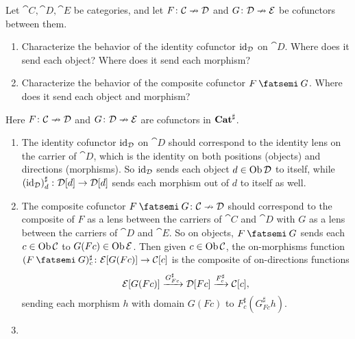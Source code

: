 \documentclass[Book-Poly]{subfiles}
\begin{document}
\begin{exercise}
Let $\cat{C},\cat{D},\cat{E}$ be categories, and let $F\colon\mathcal{C}\nrightarrow\mathcal{D}$ and $G\colon\mathcal{D}\nrightarrow\mathcal{E}$ be cofunctors between them.
\begin{enumerate}
    \item Characterize the behavior of the identity cofunctor $\mathrm{id}_{\mathcal{D}}$ on $\cat{D}$.
    Where does it send each object?
    Where does it send each morphism?
    \item Characterize the behavior of the composite cofunctor $F\then G$.
    Where does it send each object and morphism?\qedhere
\end{enumerate}
\begin{solution}
Here $F\colon\mathcal{C}\nrightarrow\mathcal{D}$ and $G\colon\mathcal{D}\nrightarrow\mathcal{E}$ are cofunctors in $\mathbf{Cat}^\sharp$.
\begin{enumerate}
    \item The identity cofunctor $\mathrm{id}_{\mathcal{D}}$ on $\cat{D}$ should correspond to the identity lens on the carrier of $\cat{D}$, which is the identity on both positions (objects) and directions (morphisms).
    So $\mathrm{id}_{\mathcal{D}}$ sends each object $d\in\operatorname{Ob}\mathcal{D}$ to itself, while $\left(\mathrm{id}_{\mathcal{D}}\right)^\sharp_d\colon\mathcal{D}[d]\to\mathcal{D}[d]$ sends each morphism out of $d$ to itself as well.
    \item The composite cofunctor $F\then G\colon\cat{C}\coto\cat{D}$ should correspond to the composite of $F$ as a lens between the carriers of $\cat{C}$ and $\cat{D}$ with $G$ as a lens between the carriers of $\cat{D}$ and $\cat{E}$.
    So on objects, $F\then G$ sends each $c\in\operatorname{Ob}\mathcal{C}$ to $G(Fc)\in\operatorname{Ob}\mathcal{E}$.
    Then given $c\in\operatorname{Ob}\mathcal{C}$, the on-morphisms function $(F\then G)^\sharp_c\colon\cat{E}[G(Fc)]\to\cat{C}[c]$ is the composite of on-directions functions
    \[
        \mathcal{E}[G(Fc)]\xrightarrow{G^\sharp_{Fc}}\mathcal{D}[Fc]\xrightarrow{F^\sharp_c}\mathcal{C}[c],
    \]
    sending each morphism $h$ with domain $G(Fc)$ to $F^\sharp_c\left(G^\sharp_{Fc}h\right)$.
    \item
\end{enumerate}
\end{solution}
\end{exercise}
\end{document}
